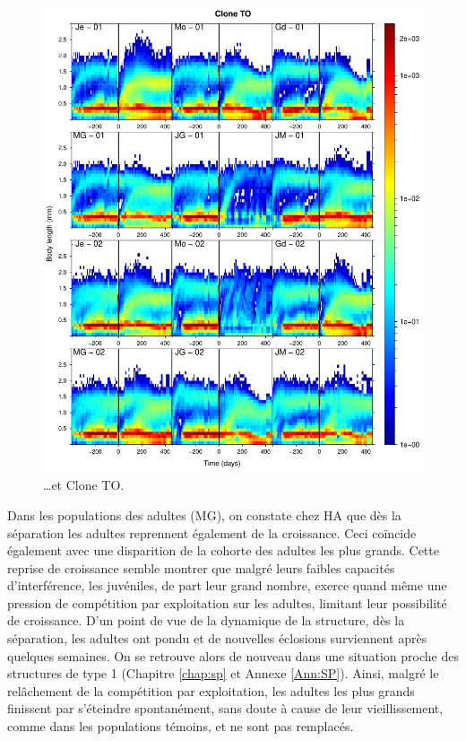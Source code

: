 {{\begin{figure}[p]
		\includegraphics[width=\textwidth]{1_CorpsDeThese/Resumes/Fig/SM03b}
        \caption*{\ldots et Clone TO.}
    \end{figure}
    \clearpage
    }%
}



Dans les populations des adultes (MG), on constate chez HA que dès la séparation
les adultes reprennent également de la croissance. Ceci coïncide également avec
une disparition de la cohorte des adultes les plus grands. Cette reprise de
croissance semble montrer que malgré leurs faibles capacités d'interférence, les
juvéniles, de part leur grand nombre, exerce quand même une pression de
compétition par exploitation sur les adultes, limitant leur possibilité de
croissance. D'un point de vue de la dynamique de la structure, dès la
séparation, les adultes ont pondu et de nouvelles éclosions surviennent après
quelques semaines. On se retrouve alors de nouveau dans une situation proche des
structures de type 1 (Chapitre \ref{chap:sp} et Annexe \ref{Ann:SP}).
Ainsi, malgré le relâchement de la compétition par exploitation, les adultes les
plus grands finissent par s'éteindre spontanément, sans doute à cause de leur
vieillissement, comme dans les populations témoins, et ne sont pas remplacés.

